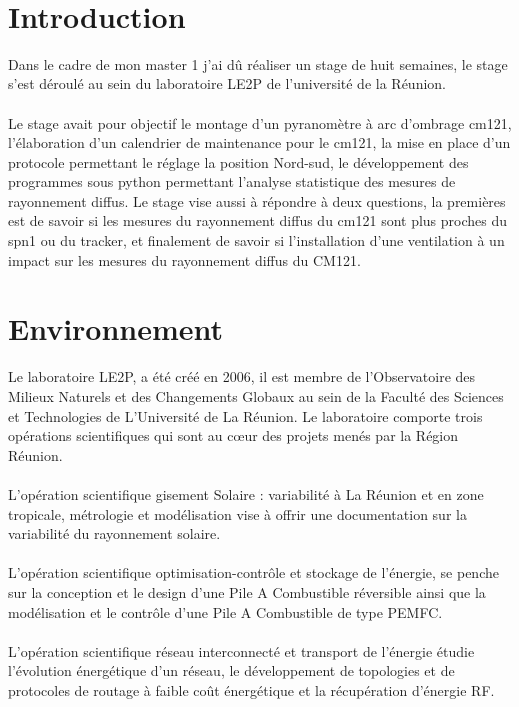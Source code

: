 \documentclass[12pt,a4paper]{article}
\begin{document}
 
~


\newpage







\thispagestyle{empty}
\renewcommand{\contentsname}{Sommaire}
\tableofcontents
\newpage

\newpage


\begin{flushleft}


\sf
\section*{Introduction}
%
\setcounter{page}{3}

Dans le cadre de mon master 1 j'ai dû réaliser un stage de huit semaines, le stage s'est déroulé au sein du laboratoire LE2P de l'université de la Réunion.\\
~\\
Le stage avait pour objectif le montage d'un pyranomètre à arc d'ombrage cm121, l'élaboration d'un calendrier de maintenance pour le cm121, la mise en place d'un protocole permettant le réglage la position Nord-sud, le développement des programmes sous python permettant l'analyse statistique des mesures de rayonnement diffus. Le stage vise aussi à répondre à deux questions, la premières est de savoir si les mesures du rayonnement diffus du cm121 sont plus proches  du spn1 ou du tracker, et finalement de savoir si l'installation d'une ventilation à un impact sur les mesures du rayonnement diffus du CM121.
 

\section{Environnement}



Le laboratoire LE2P, a été créé en 2006,  il est membre de l’Observatoire des Milieux Naturels et des Changements Globaux au sein de la Faculté des Sciences et Technologies de L’Université de La Réunion. Le laboratoire comporte trois opérations scientifiques qui sont au cœur des projets menés par la Région Réunion.\\
~\\
L'opération scientifique gisement Solaire : variabilité à La Réunion et en zone tropicale, métrologie et modélisation  vise à offrir une documentation sur la variabilité du rayonnement solaire.\\
~\\
L'opération scientifique optimisation-contrôle et stockage de l'énergie, se penche sur la conception et le design d’une Pile A Combustible réversible ainsi que la modélisation et le contrôle d’une Pile A Combustible de type PEMFC.\\ 
~\\
L'opération scientifique réseau interconnecté et transport de l'énergie étudie l’évolution énergétique d'un réseau, le développement de topologies et de protocoles de routage à faible coût énergétique et la récupération d’énergie RF.




\end{flushleft}
\end{document}
